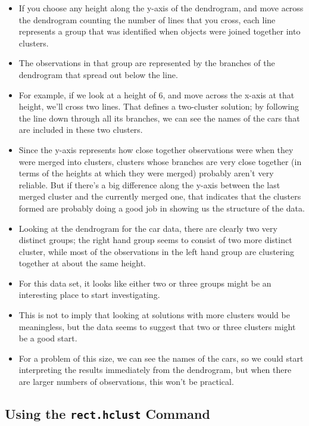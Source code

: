 \documentclass[12pt]{article}
\begin{document}
\begin{itemize}
\item If you choose any height along the y-axis of the dendrogram, and move across the dendrogram counting the number of lines that you cross, each line represents a group that was identified when objects were joined together into clusters.
\item  The observations in that group are represented by the branches of the dendrogram that spread out below the line.
\item  For example, if we look at a height of 6, and move across the x-axis at that height, we'll cross two lines. That defines a two-cluster solution; by following the line down through all its branches, we can see the names of the cars that are included in these two clusters. 
\item Since the y-axis represents how close together observations were when they were merged into clusters, clusters whose branches are very close together (in terms of the heights at which they were merged) probably aren't very reliable. But if there's a big difference along the y-axis between the last merged cluster and the currently merged one, that indicates that the clusters formed are probably doing a good job in showing us the structure of the data.
\end{itemize}

\newpage
\begin{itemize}
\item  Looking at the dendrogram for the car data, there are clearly two very distinct groups; the right hand group seems to consist of two more distinct cluster, while most of the observations in the left hand group are clustering together at about the same height.
\item For this data set, it looks like either two or three groups might be an interesting place to start investigating. 
\item This is not to imply that looking at solutions with more clusters would be meaningless, but the data seems to suggest that two or three clusters might be a good start.
\item For a problem of this size, we can see the names of the cars, so we could start interpreting the results immediately from the dendrogram, but when there are larger numbers of observations, this won't be practical.
\end{itemize}
\newpage
\subsection{Using the \texttt{rect.hclust} Command}
\end{document}
